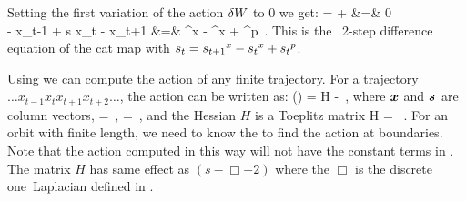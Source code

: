 Setting the first variation of the action $\delta W$ to 0 we get:
\bea
{} =
 +  &=& 0 \\
\Rightarrow  - x_{t-1} + s x_t - x_{t+1}
&=& ^x - ^x + ^p
\,.
\label{ActVariantion}
\eea
This is the \PV\ 2-step difference equation of the cat map with ${s_{t}} = {s_{t+1}}^x - {s_{t}}^x + {s_{t}}^p$.

Using  we can compute the action of
any finite trajectory. For a trajectory $\dots x_{t-1}
x_{t} x_{t+1} x_{t+2} \dots$, the action can be
written as:
\beq
\action() =   H  - \transp{\bi{\Ssym{}}} 
\,,
where $\bi{x}$ and $\bi{\Ssym{}}$ are column vectors,
\bea
{}
=
\,,
\quad
\bi{\Ssym{}}
=
\,,
\label{eq:VectorFieldSourceNonPeriodic}
\eea
and the Hessian $H$ is a Toeplitz matrix
\bea
H
=
 \, .
\label{eq:HessianMatrixNonPeriodic}
\eea
For an orbit with finite length, we need to know the {\bcs}
to find the action at boundaries. Note that the action computed in this
way will not have the constant terms in . The
matrix $H$ has same effect as $(s-\Box -2)$ where the $\Box$ is the
discrete one\dmn\ Laplacian defined in .

